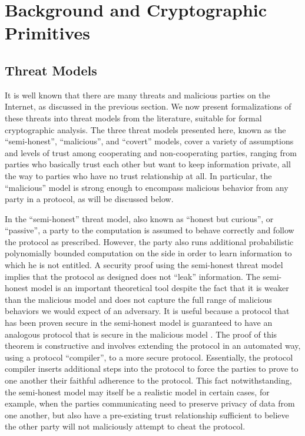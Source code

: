 
\chapter{Background and Cryptographic Primitives}


\section{Threat Models\label{sub:Threat-Models}}

It is well known that there are many threats and malicious parties
on the Internet, as discussed in the previous section. We now present
formalizations of these threats into threat models from the literature,
suitable for formal cryptographic analysis. The three threat models
presented here, known as the {}``semi-honest'', {}``malicious'',
and {}``covert'' models, cover a variety of assumptions and levels
of trust among cooperating and non-cooperating parties, ranging from
parties who basically trust each other but want to keep information
private, all the way to parties who have no trust relationship at
all. In particular, the {}``malicious'' model is strong enough to
encompass malicious behavior from any party in a protocol, as will
be discussed below.

In the {}``semi-honest'' threat model, also known as {}``honest
but curious'', or {}``passive'', \cite{GMW87} a party to the computation
is assumed to behave correctly and follow the protocol as prescribed.
However, the party also runs additional probabilistic polynomially
bounded computation on the side in order to learn information to which
he is not entitled. A security proof using the semi-honest threat
model implies that the protocol as designed does not {}``leak''
information. The semi-honest model is an important theoretical tool
despite the fact that it is weaker than the malicious model and does
not capture the full range of malicious behaviors we would expect
of an adversary. It is useful because a protocol that has been proven
secure in the semi-honest model is guaranteed to have an analogous
protocol that is secure in the malicious model \cite{GMW87}. The
proof of this theorem is constructive and involves extending the protocol
in an automated way, using a protocol {}``compiler'', to a more
secure protocol. Essentially, the protocol compiler inserts additional
steps into the protocol to force the parties to prove to one another
their faithful adherence to the protocol. This fact notwithstanding,
the semi-honest model may itself be a realistic model in certain cases,
for example, when the parties communicating need to preserve privacy
of data from one another, but also have a pre-existing trust relationship
sufficient to believe the other party will not maliciously attempt
to cheat the protocol.


